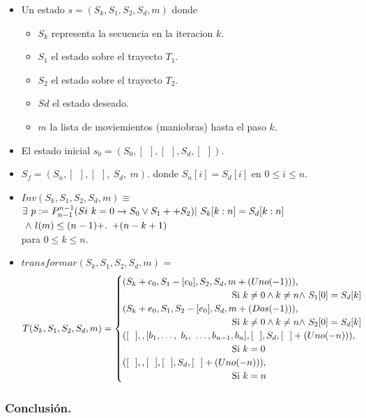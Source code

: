\documentclass[12pt, a4paper]{article}
\begin{document}
\begin{itemize}
  \item Un estado $s=(S_k, S_1, S_2, S_d, m)$ donde
  \begin{itemize}
    \item $S_k$ representa la secuencia en la iteracion $k$.
    \item $S_1$ el estado sobre el trayecto $T_1$.
    \item $S_2$ el estado sobre el trayecto $T_2$.
    \item $Sd$ el estado deseado.
    \item $m$ la lista de moviemientos (maniobras) hasta el paso $k$.
  \end{itemize}
  \item El estado inicial $s_0=(S_0, [~~], [~~], S_d, [~~])$.
  \item $S_f=(S_n, [~~], [~~],~S_d,~ m)$. donde $S_n[i] = S_d[i]$ en $0 \leq i \leq n$.
  \item $Inv(S_k, S_1, S_2, S_d, m)\equiv$ $ \exists~p := P_{n-1}^{n-1} ( Si~k = 0 \rightarrow S_0 \lor S_1  ++ S_2) \\ |~S_k[k:n] = S_d[k:n]$ $~\land~l(m) \leq (n-1) + \ldotp~+ (n-k+1)$ \\
  para $0 \leq k \leq n$.
  \item $transformar(S_k, S_1, S_2, S_d, m)$ = \[   
    T(S_k, S_1, S_2, S_d, m) = 
    \begin{cases}
       \text{$(S_k + c_0, S_1 - [c_0], S_2,  S_d, m + (Uno(-1)))$,} \\ ~~~~~~~~~~~~~~~~~~~~~~~~~~~~~~~~~~~ \text{Si $ k \neq 0 \land k \neq n \land~$$S_1[0] = S_d[k]$}\\
       \text{$(S_k + e_0, S_1, S_2 - [e_0],  S_d, m + (Dos(-1)))$,} \\ ~~~~~~~~~~~~~~~~~~~~~~~~~~~~~~~~~~~ \text{Si $ k \neq 0 \land k \neq n \land~$$S_2[0] = S_d[k]$}\\
       \text{$([~~], , [b_1, \ldots,~b_i,~\ldots, b_{n-1}, b_n], [~~],  S_d, [~~] + (Uno(-n)))$,}  \\ ~~~~~~~~~~~~~~~~~~~~~~~~~~~~~~~~~~~ \text{Si $ k = 0$}\\
       \text{$([~~], , [~~], [~~],  S_d, [~~] + (Uno(-n)))$,}  \\ ~~~~~~~~~~~~~~~~~~~~~~~~~~~~~~~~~~~ \text{Si $ k = n$}\\
     \end{cases}
\]
\end{itemize}

\subsubsection{Conclusión.}
\end{document}
